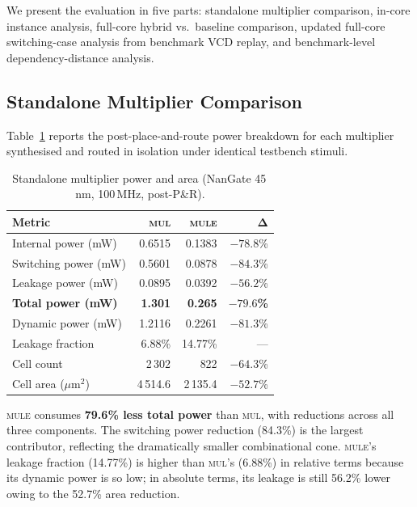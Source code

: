 
We present the evaluation in five parts: standalone multiplier
comparison, in-core instance analysis, full-core hybrid vs.\ baseline
comparison, updated full-core switching-case analysis from benchmark VCD
replay, and benchmark-level dependency-distance analysis.

\subsection{Standalone Multiplier Comparison}\label{sec:eval:standalone}

Table~\ref{tab:standalone_power} reports the post-place-and-route
power breakdown for each multiplier synthesised and routed in
isolation under identical testbench stimuli.

\begin{table}[t]
  \caption{Standalone multiplier power and area (NanGate 45\,nm,
           100\,MHz, post-P\&R).}
  \label{tab:standalone_power}
  \centering
  \small
  \begin{tabular}{lrrr}
    \toprule
    \textbf{Metric} & \textbf{\textsc{mul}} & \textbf{\textsc{mule}} & $\boldsymbol{\Delta}$ \\
    \midrule
    Internal power (mW) & 0.6515 & 0.1383 & $-78.8$\% \\
    Switching power (mW)& 0.5601 & 0.0878 & $-84.3$\% \\
    Leakage power (mW)  & 0.0895 & 0.0392 & $-56.2$\% \\
    \textbf{Total power (mW)} & \textbf{1.301} & \textbf{0.265} & $\boldsymbol{-79.6}$\textbf{\%} \\
    \midrule
    Dynamic power (mW)  & 1.2116 & 0.2261 & $-81.3$\% \\
    Leakage fraction     & 6.88\% & 14.77\% & --- \\
    \midrule
    Cell count           & 2\,302  & 822    & $-64.3$\% \\
    Cell area ($\mu$m$^{2}$) & 4\,514.6 & 2\,135.4 & $-52.7$\% \\
    \bottomrule
  \end{tabular}
\end{table}

\textsc{mule} consumes \textbf{79.6\% less total power} than
\textsc{mul}, with reductions across all three components.  The
switching power reduction (84.3\%) is the largest contributor,
reflecting the dramatically smaller combinational cone.
\textsc{mule}'s leakage fraction (14.77\%) is higher than \textsc{mul}'s
(6.88\%) in relative terms because its dynamic power is so low;
in absolute terms, its leakage is still 56.2\% lower owing to the
52.7\% area reduction.

